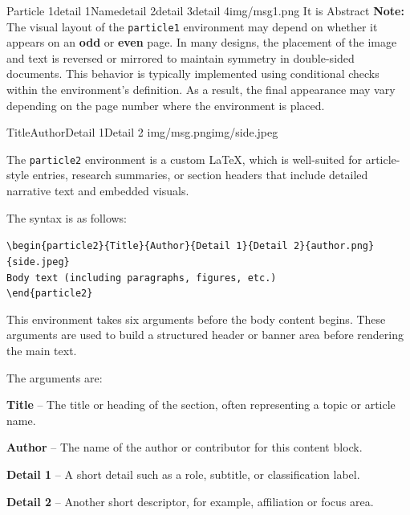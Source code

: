 \documentclass[10pt,twoside]{article}
\begin{document}
{	\begin{particle1}{Particle 1}{detail 1}{Name}{detail 2}{detail 3}{detail 4}{img/msg1.png}
	{It is Abstract}
	{\textbf{Note:} The visual layout of the \texttt{particle1} environment may depend on whether it appears on an \textbf{odd} or \textbf{even} page. In many designs, the placement of the image and text is reversed or mirrored to maintain symmetry in double-sided documents. This behavior is typically implemented using conditional checks within the environment's definition. As a result, the final appearance may vary depending on the page number where the environment is placed.}
  	\end{particle1}
  

    \begin{particle2}{Title}{Author}{Detail 1}{Detail 2} {img/msg.png}{img/side.jpeg}
                
        The \texttt{particle2} environment is a custom LaTeX, which is well-suited for article-style entries, research summaries, or section headers that include detailed narrative text and embedded visuals.
        
        The syntax is as follows:
        
        \texttt{\textbackslash begin\{particle2\}\{Title\}\{Author\}\{Detail 1\}\{Detail 2\}\{author.png\}\{side.jpeg\}}\\
        \texttt{Body text (including paragraphs, figures, etc.)}\\
        \texttt{\textbackslash end\{particle2\}}
        
        This environment takes six arguments before the body content begins. These arguments are used to build a structured header or banner area before rendering the main text.
        
        The arguments are:
        
        \bullet \textbf{Title} – The title or heading of the section, often representing a topic or article name.
        
        \bullet \textbf{Author} – The name of the author or contributor for this content block.
        
        \bullet \textbf{Detail 1} – A short detail such as a role, subtitle, or classification label.
        
        \bullet \textbf{Detail 2} – Another short descriptor, for example, affiliation or focus area.
        

\end{particle2}}
\end{document}
